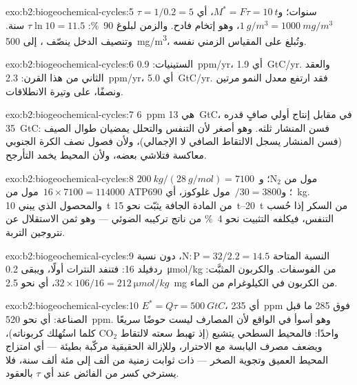 \begin{solution}{exo:b2:biogeochemical-cycles:5}
$\tau = 1/0.2 = 5$ سنوات؛ و$M^{*} = F\tau = \qty{10}{t}$، أي
$\qty{1}{g/m^3} = \qty{1000}{mg/m^3}$، وهو إتخام فادح. والزمن لبلوغ
\qty{90}{\%}: $\tau\ln 10 = 11.5$ سنة. وتنصيف الدخل ينصّف
، إلى \qty{500}{mg/m^3}، وتُبلغ على المقياس الزمني
نفسه.
\end{solution}

\begin{solution}{exo:b2:biogeochemical-cycles:6}
الستينيات: \qty{0.9}{ppm/yr}، أي \qty{1.9}{GtC/yr}. والعقد الثاني من هذا القرن: \qty{2.3}{ppm/yr}،
أي \qty{5.0}{GtC/yr}. فقد ارتفع معدل النمو مرتين ونصفًا،
على وتيرة الانطلاقات.
\end{solution}

\begin{solution}{exo:b2:biogeochemical-cycles:7}
\qty{6}{ppm} هي \qty{13}{GtC}، في مقابل إنتاج أولي صافٍ قدره
\qty{35}{GtC}: فسن المنشار ثلثه. وهو أصغر لأن
التنفس والتحلل يمضيان طوال الصيف (فسن المنشار
يسجل الالتقاط الصافي لا الإجمالي)، ولأن فصول نصف الكرة
الجنوبي معاكسة فتلاشي بعضه، ولأن
المحيط يخمد التأرجح.
\end{solution}

\begin{solution}{exo:b2:biogeochemical-cycles:8}
$\qty{200}{kg}/(\qty{28}{g/mol}) = 7100$~مول من $\mathrm{N_2}$؛ و$16\times
7100 = \num{114000}$~مول من ATP؛ و$/30 = 3800$~مول غلوكوز، أي \qty{690}{kg}.
والمحصول الذي يبني \qty{10}{t} من المادة الجافة يثبّت نحو
\qtyrange{15}{20}{t} من السكر إذا حُسب التنفس، فيكلفه
التثبيت نحو \qty{4}{\%} من ناتج تركيبه الضوئي --- وهو
ثمن الاستقلال عن نتروجين التربة.
\end{solution}

\begin{solution}{exo:b2:biogeochemical-cycles:9}
النسبة المتاحة $\mathrm{N:P} = 32/2.2 = 14.5$، دون نسبة ردفيلد
16: فتنفد النترات أولًا، ويبقى \qty{0.2}{\micro mol/kg} من
الفوسفات. والكربون المثبَّت: $32\times 106/16 =
\qty{212}{\micro mol/kg}$، أي نحو \qty{2.5}{mg} من الكربون في
الكيلوغرام من الماء.
\end{solution}

\begin{solution}{exo:b2:biogeochemical-cycles:10}
$E^{*} = Q\tau = \qty{500}{GtC}$، أي \qty{235}{ppm} فوق
285 ما قبل الصناعة: أي نحو \qty{520}{ppm}. وهو أسوأ في الواقع لأن
المصارف ليست حوضًا سريعًا واحدًا: فالمحيط السطحي يتشبع
(إذ تهبط سعته لالتقاط $\mathrm{CO_2}$ كلما استُهلك كربوناته)،
ويضعف مصرف اليابسة مع الاحترار، وللإزالة الحقيقية مركّبة
بطيئة --- أي امتزاج المحيط العميق وتجوية الصخر --- ذات
ثوابت زمنية من ألف إلى مئة ألف سنة، فلا يسترخي
كسر من الفائض عند أي $\tau$ بالعقود.
\end{solution}

